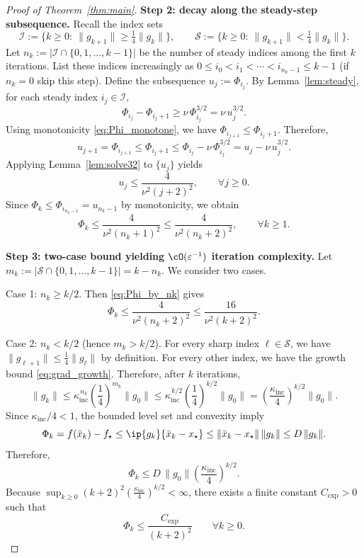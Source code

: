 \documentclass[review,onefignum,onetabnum]{siamart171218}
\begin{document}
\begin{proof}[Proof of Theorem~\ref{thm:main}]
\smallskip
\noindent\textbf{Step 2: decay along the steady-step subsequence.}
Recall the index sets
\[
\mathcal I:=\{k\ge 0:\ \|g_{k+1}\|\ge \tfrac14\|g_k\|\},
\qquad
\mathcal S:=\{k\ge 0:\ \|g_{k+1}\|< \tfrac14\|g_k\|\}.
\]
Let $n_k:=|\mathcal I\cap\{0,1,\dots,k-1\}|$ be the number of steady indices among the first $k$ iterations.
List these indices increasingly as $0\le i_0<i_1<\cdots<i_{n_k-1}\le k-1$ (if $n_k=0$ skip this step).
Define the subsequence $u_j:=\Phi_{i_j}$.
By Lemma~\ref{lem:steady}, for each steady index $i_j\in\mathcal I$,
\[
\Phi_{i_j}-\Phi_{i_j+1}\ge \nu\,\Phi_{i_j}^{3/2}=\nu\,u_j^{3/2}.
\]
Using monotonicity \eqref{eq:Phi_monotone}, we have $\Phi_{i_{j+1}}\le \Phi_{i_j+1}$.
Therefore,
\[
u_{j+1}=\Phi_{i_{j+1}}
\le \Phi_{i_j+1}
\le \Phi_{i_j}-\nu\,\Phi_{i_j}^{3/2}
= u_j-\nu\,u_j^{3/2}.
\]
Applying Lemma~\ref{lem:solve32} to $\{u_j\}$ yields
\begin{equation}\label{eq:u_bound}
u_j\le \frac{4}{\nu^2(j+2)^2},\qquad \forall j\ge 0.
\end{equation}
Since $\Phi_k\le \Phi_{i_{n_k-1}}=u_{n_k-1}$ by monotonicity, we obtain
\begin{equation}\label{eq:Phi_by_nk}
\Phi_k\le \frac{4}{\nu^2(n_k+1)^2}\le \frac{4}{\nu^2(n_k+2)^2},
\qquad \forall k\ge 1.
\end{equation}

\smallskip
\noindent\textbf{Step 3: two-case bound yielding $\cO(\varepsilon^{-1})$ iteration complexity.}
Let $m_k:=|\mathcal S\cap\{0,1,\dots,k-1\}|=k-n_k$.
We consider two cases.

Case 1: $n_k\ge k/2$.
Then \eqref{eq:Phi_by_nk} gives
\[
\Phi_k\le \frac{4}{\nu^2(n_k+2)^2}\le \frac{16}{\nu^2(k+2)^2}.
\]

Case 2: $n_k< k/2$ (hence $m_k>k/2$).
For every sharp index $\ell\in\mathcal S$, we have $\|g_{\ell+1}\|\le \frac14\|g_\ell\|$ by definition.
For every other index, we have the growth bound \eqref{eq:grad_growth}.
Therefore, after $k$ iterations,
\[
\|g_k\|
\le \kappa_{\mathrm{inc}}^{\,n_k}\left(\frac14\right)^{m_k}\|g_0\|
\le \kappa_{\mathrm{inc}}^{\,k/2}\left(\frac14\right)^{k/2}\|g_0\|
=\left(\frac{\kappa_{\mathrm{inc}}}{4}\right)^{k/2}\|g_0\|.
\]
Since $\kappa_{\mathrm{inc}}/4<1$, the bounded level set and convexity imply
\[
\Phi_k=f(\bar x_k)-f_\star
\le \ip{g_k}{\bar x_k-x_\star}
\le \|\bar x_k-x_\star\|\,\|g_k\|
\le D\,\|g_k\|.
\]
Therefore,
\[
\Phi_k\le D\,\|g_0\|\left(\frac{\kappa_{\mathrm{inc}}}{4}\right)^{k/2}.
\]
Because $\sup_{k\ge 0}(k+2)^2\left(\frac{\kappa_{\mathrm{inc}}}{4}\right)^{k/2}<\infty$, there exists a finite constant $C_{\exp}>0$ such that
\[
\Phi_k\le \frac{C_{\exp}}{(k+2)^2}\qquad\forall k\ge 0.
\]


\end{proof}
\end{document}
